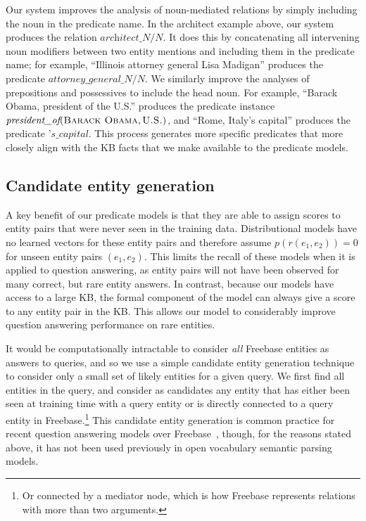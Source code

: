 \documentclass[11pt,letterpaper]{article}
\newcommand{\lexicalpredicate}[1]{\ensuremath{\textit{#1}}}
\newcommand{\entity}[1]{\ensuremath{\textsc{#1}}}
\newcommand{\prob}{\ensuremath{p}}
\begin{document}
Our system improves the analysis of noun-mediated relations by simply including the noun in the
predicate name. In the architect example above, our system produces the relation
\lexicalpredicate{architect\_N/N}. It does this by concatenating all intervening noun modifiers
between two entity mentions and including them in the predicate name; for example, ``Illinois
attorney general Lisa Madigan'' produces the predicate \lexicalpredicate{attorney\_general\_N/N}.
We similarly improve the analyses of prepositions and possessives to include the head noun. For
example, ``Barack Obama, president of the U.S.'' produces the predicate instance
$\lexicalpredicate{president\_of}(\entity{Barack Obama}, \entity{U.S.})$, and ``Rome, Italy's
capital'' produces the predicate \lexicalpredicate{'s\_capital}. This process generates more
specific predicates that more closely align with the KB facts that we make available to the
predicate models.

\subsection{Candidate entity generation}
\label{sec:better-candidates}

A key benefit of our predicate models is that they are able to assign scores to entity pairs that
were never seen in the training data. Distributional models have no learned vectors for these
entity pairs and therefore assume $\prob(r(e_1,e_2)) = 0$ for unseen entity pairs $(e_1,e_2)$. This
limits the recall of these models when it is applied to question answering, as entity pairs will
not have been observed for many correct, but rare entity answers. In contrast, because our models
have access to a large KB, the formal component of the model can always give a score to any entity
pair in the KB.  This allows our model to considerably improve question answering performance on
rare entities.

It would be computationally intractable to consider \emph{all} Freebase entities as answers to
queries, and so we use a simple candidate entity generation technique to consider only a small set
of likely entities for a given query.  We first find all entities in the query, and consider as
candidates any entity that has either been seen at training time with a query entity or is directly
connected to a query entity in Freebase.\footnote{Or connected by a mediator node, which is how
Freebase represents relations with more than two arguments.} This candidate entity generation is
common practice for recent question answering models over
Freebase~\cite{yih-2015-semparse-query-graph}, though, for the reasons stated above, it has not
been used previously in open vocabulary semantic parsing models.
\end{document}
